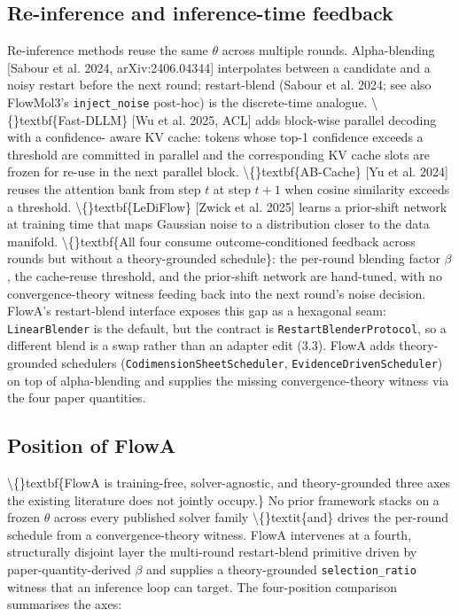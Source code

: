 \documentclass[preprint,3p,times,twocolumn]{elsarticle}
\begin{document}
\subsection{Re-inference and inference-time feedback}
Re-inference methods reuse the same $\theta$ across multiple rounds. Alpha-blending [Sabour et al. 2024, arXiv:2406.04344] interpolates between a candidate and a noisy restart before the next round; restart-blend (Sabour et al. 2024; see also FlowMol3's \texttt{inject\_noise} post-hoc) is the discrete-time analogue. \textbackslash\{\}textbf\{Fast-DLLM\} [Wu et al. 2025, ACL] adds block-wise parallel decoding with a confidence- aware KV cache: tokens whose top-1 confidence exceeds a threshold are committed in parallel and the corresponding KV cache slots are frozen for re-use in the next parallel block. \textbackslash\{\}textbf\{AB-Cache\} [Yu et al. 2024] reuses the attention bank from step $t$ at step $t+1$ when cosine similarity exceeds a threshold. \textbackslash\{\}textbf\{LeDiFlow\} [Zwick et al. 2025] learns a prior-shift network at training time that maps Gaussian noise to a distribution closer to the data manifold. \textbackslash\{\}textbf\{All four consume outcome-conditioned feedback across rounds but without a theory-grounded schedule\}: the per-round blending factor $\beta$, the cache-reuse threshold, and the prior-shift network are hand-tuned, with no convergence-theory witness feeding back into the next round's noise decision. FlowA's restart-blend interface exposes this gap as a hexagonal seam: \texttt{LinearBlender} is the default, but the contract is \texttt{RestartBlenderProtocol}, so a different blend is a swap rather than an adapter edit (3.3). FlowA adds theory-grounded schedulers (\texttt{CodimensionSheetScheduler}, \texttt{EvidenceDrivenScheduler}) on top of alpha-blending and supplies the missing convergence-theory witness via the four paper quantities.

\subsection{Position of FlowA}
\textbackslash\{\}textbf\{FlowA is training-free, solver-agnostic, and theory-grounded  three axes the existing literature does not jointly occupy.\} No prior framework stacks on a frozen $\theta$ across every published solver family \textbackslash\{\}textit\{and\} drives the per-round schedule from a convergence-theory witness. FlowA intervenes at a fourth, structurally disjoint layer  the multi-round restart-blend primitive driven by paper-quantity-derived $\beta$  and supplies a theory-grounded \texttt{selection\_ratio} witness that an inference loop can target. The four-position comparison summarises the axes:
\end{document}
